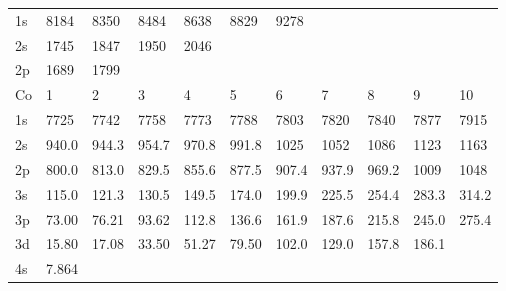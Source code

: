 \begin{table}
\begin{center}
\begin{tabular}{lllllllllll}
\hline
1s&  8184&
8350&  8484&  8638&  8829&  9278\\
2s&  1745&  1847&  1950&  2046\\
2p&  1689&  1799\\
\hline
Co&
1&   2&   3&   4&   5&   6&   7&   8&   9&  10\\
\hline
1s&  7725&  7742&  7758&  7773&  7788&  7803&
7820&  7840&  7877&  7915\\
2s& 940.0& 944.3& 954.7& 970.8& 991.8&  1025&  1052&  1086&
1123&  1163\\
2p& 800.0& 813.0& 829.5& 855.6& 877.5& 907.4& 937.9& 969.2& 1009&  1048\\
3s&
115.0& 121.3& 130.5& 149.5& 174.0& 199.9& 225.5& 254.4& 283.3& 314.2\\
3p& 73.00& 76.21&
93.62& 112.8& 136.6& 161.9& 187.6& 215.8& 245.0& 275.4\\
3d& 15.80& 17.08& 33.50& 51.27&
79.50& 102.0& 129.0& 157.8& 186.1\\
4s& 7.864\\
\hline
\end{tabular}
\end{center}
\end{table}


